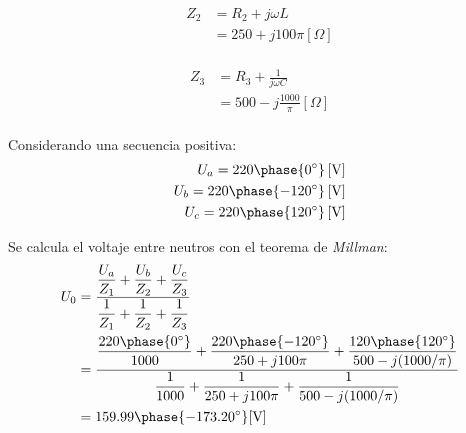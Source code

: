 \documentclass[letter,11pt]{article}
\begin{document}
\begin{equation*}
    \begin{split}
        Z_2 &= R_2+j\omega L\\
            &= 250+j100\pi[\Omega]\\
    \end{split}
\end{equation*}

\begin{equation*}
    \begin{split}
        Z_3 &= R_3+\frac{1}{j\omega C}\\
            &= 500-j\frac{1000}{\pi}[\Omega]\\
    \end{split}
\end{equation*}

Considerando una secuencia positiva:
\begin{equation*}
    \begin{split}
        U_a = 220\phase{0^{\circ}}\,[\text{V}]\\
        U_b = 220\phase{-120^{\circ}}\,[\text{V}]\\
        U_c = 220\phase{120^{\circ}}\,[\text{V}]\\
    \end{split}
\end{equation*}

Se calcula el voltaje entre neutros con el teorema de \emph{Millman}:
\begin{equation*}
    \begin{split}
        U_0 &= \dfrac{
                   \dfrac{U_a}{Z_1}+\dfrac{U_b}{Z_2}+\dfrac{U_c}{Z_3}
               }{
                   \dfrac{1}{Z_1}+\dfrac{1}{Z_2}+\dfrac{1}{Z_3}
               }\\
            &= \dfrac{
                   \dfrac{220\phase{0^{\circ}}}{1000}+
                   \dfrac{220\phase{-120^{\circ}}}{250+j100\pi}+
                   \dfrac{120\phase{120^{\circ}}}{500-j(1000/\pi)}
               }{
                   \dfrac{1}{1000}+
                   \dfrac{1}{250+j100\pi}+
                   \dfrac{1}{500-j(1000/\pi)}
               }\\
            &= 159.99\phase{-173.20^{\circ}}[\text{V}]\\
    \end{split}
\end{equation*}
\end{document}

